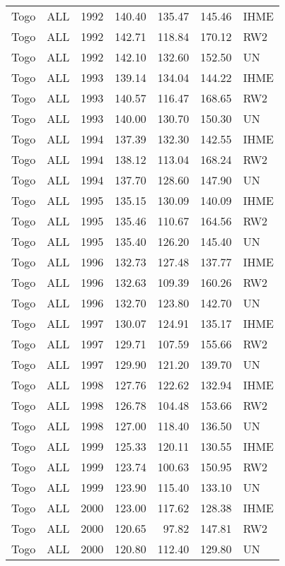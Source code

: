 \begin{longtable}{lllrrrl}
  Togo & ALL & 1992 & 140.40 & 135.47 & 145.46 & IHME \\ 
  Togo & ALL & 1992 & 142.71 & 118.84 & 170.12 & RW2 \\ 
  Togo & ALL & 1992 & 142.10 & 132.60 & 152.50 & UN \\ 
  Togo & ALL & 1993 & 139.14 & 134.04 & 144.22 & IHME \\ 
  Togo & ALL & 1993 & 140.57 & 116.47 & 168.65 & RW2 \\ 
  Togo & ALL & 1993 & 140.00 & 130.70 & 150.30 & UN \\ 
  Togo & ALL & 1994 & 137.39 & 132.30 & 142.55 & IHME \\ 
  Togo & ALL & 1994 & 138.12 & 113.04 & 168.24 & RW2 \\ 
  Togo & ALL & 1994 & 137.70 & 128.60 & 147.90 & UN \\ 
  Togo & ALL & 1995 & 135.15 & 130.09 & 140.09 & IHME \\ 
  Togo & ALL & 1995 & 135.46 & 110.67 & 164.56 & RW2 \\ 
  Togo & ALL & 1995 & 135.40 & 126.20 & 145.40 & UN \\ 
  Togo & ALL & 1996 & 132.73 & 127.48 & 137.77 & IHME \\ 
  Togo & ALL & 1996 & 132.63 & 109.39 & 160.26 & RW2 \\ 
  Togo & ALL & 1996 & 132.70 & 123.80 & 142.70 & UN \\ 
  Togo & ALL & 1997 & 130.07 & 124.91 & 135.17 & IHME \\ 
  Togo & ALL & 1997 & 129.71 & 107.59 & 155.66 & RW2 \\ 
  Togo & ALL & 1997 & 129.90 & 121.20 & 139.70 & UN \\ 
  Togo & ALL & 1998 & 127.76 & 122.62 & 132.94 & IHME \\ 
  Togo & ALL & 1998 & 126.78 & 104.48 & 153.66 & RW2 \\ 
  Togo & ALL & 1998 & 127.00 & 118.40 & 136.50 & UN \\ 
  Togo & ALL & 1999 & 125.33 & 120.11 & 130.55 & IHME \\ 
  Togo & ALL & 1999 & 123.74 & 100.63 & 150.95 & RW2 \\ 
  Togo & ALL & 1999 & 123.90 & 115.40 & 133.10 & UN \\ 
  Togo & ALL & 2000 & 123.00 & 117.62 & 128.38 & IHME \\ 
  Togo & ALL & 2000 & 120.65 & 97.82 & 147.81 & RW2 \\ 
  Togo & ALL & 2000 & 120.80 & 112.40 & 129.80 & UN \\ 

\end{longtable}
